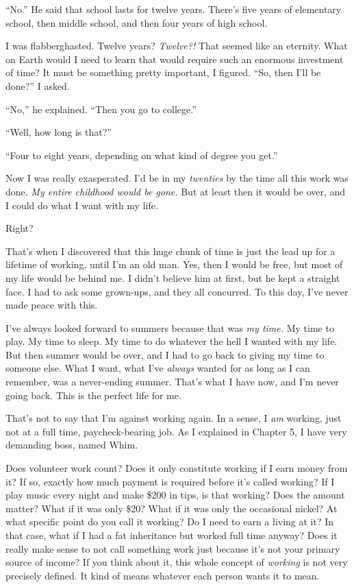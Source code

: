 ``No.'' He said that school lasts for twelve years. There's five years of elementary school, then middle school, and then four years of high school.

I was flabberghasted. Twelve years? \emph{Twelve?!} That seemed like an eternity. What on Earth would I need to learn that would require such an enormous investment of time? It must be something pretty important, I figured. ``So, then I'll be done?'' I asked.

``No,'' he explained. ``Then you go to college.''

``Well, how long is that?''

``Four to eight years, depending on what kind of degree you get.''

Now I was really exasperated. I'd be in my \emph{twenties} by the time all this work was done. \emph{My entire childhood would be gone.} But at least then it would be over, and I could do what I want with my life.

Right?

That's when I discovered that this huge chunk of time is just the lead up for a lifetime of working, until I'm an old man. Yes, then I would be free, but most of my life would be behind me. I didn't believe him at first, but he kept a straight face. I had to ask some grown-ups, and they all concurred. To this day, I've never made peace with this.

I've always looked forward to summers because that was \emph{my time.} My time to play. My time to sleep. My time to do whatever the hell I wanted with my life. But then summer would be over, and I had to go back to giving my time to someone else. What I want, what I've \emph{always} wanted for as long as I can remember, was a never-ending summer. That's what I have now, and I'm never going back. This is the perfect life for me.

That's not to say that I'm against working again. In a sense, I \emph{am} working, just not at a full time, paycheck-bearing job. As I explained in Chapter 5, I have very demanding boss, named Whim.

Does volunteer work count? Does it only constitute working if I earn money from it? If so, exactly how much payment is required before it's called working? If I play music every night and make \$200 in tips, is that working? Does the amount matter? What if it was only \$20? What if it was only the occasional nickel? At what specific point do you call it working? Do I need to earn a living at it? In that case, what if I had a fat inheritance but worked full time anyway? Does it really make sense to not call something work just because it's not your primary source of income? If you think about it, this whole concept of \emph{working} is not very precisely defined. It kind of means whatever each person wants it to mean.

